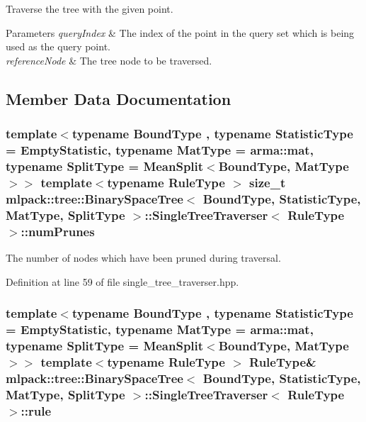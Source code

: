 Traverse the tree with the given point. 


\begin{DoxyParams}{Parameters}
{\em query\-Index} & The index of the point in the query set which is being used as the query point. \\
\hline
{\em reference\-Node} & The tree node to be traversed. \\
\hline
\end{DoxyParams}


\subsection{Member Data Documentation}
\subsubsection[{num\-Prunes}]{\setlength{\rightskip}{0pt plus 5cm}template$<$typename Bound\-Type , typename Statistic\-Type  = Empty\-Statistic, typename Mat\-Type  = arma\-::mat, typename Split\-Type  = Mean\-Split$<$\-Bound\-Type, Mat\-Type$>$$>$ template$<$typename Rule\-Type $>$ size\-\_\-t {\bf mlpack\-::tree\-::\-Binary\-Space\-Tree}$<$ Bound\-Type, Statistic\-Type, Mat\-Type, Split\-Type $>$\-::{\bf Single\-Tree\-Traverser}$<$ Rule\-Type $>$\-::num\-Prunes\hspace{0.3cm}{\ttfamily [private]}}\label{classmlpack_1_1tree_1_1BinarySpaceTree_1_1SingleTreeTraverser_a21d42f90d129cd6510512a913e858495}


The number of nodes which have been pruned during traversal. 



Definition at line 59 of file single\-\_\-tree\-\_\-traverser.\-hpp.

\subsubsection[{rule}]{\setlength{\rightskip}{0pt plus 5cm}template$<$typename Bound\-Type , typename Statistic\-Type  = Empty\-Statistic, typename Mat\-Type  = arma\-::mat, typename Split\-Type  = Mean\-Split$<$\-Bound\-Type, Mat\-Type$>$$>$ template$<$typename Rule\-Type $>$ Rule\-Type\& {\bf mlpack\-::tree\-::\-Binary\-Space\-Tree}$<$ Bound\-Type, Statistic\-Type, Mat\-Type, Split\-Type $>$\-::{\bf Single\-Tree\-Traverser}$<$ Rule\-Type $>$\-::rule\hspace{0.3cm}{\ttfamily [private]}}\label{classmlpack_1_1tree_1_1BinarySpaceTree_1_1SingleTreeTraverser_a5ea13ab92412d2adc435f2cb8586c4d5}


